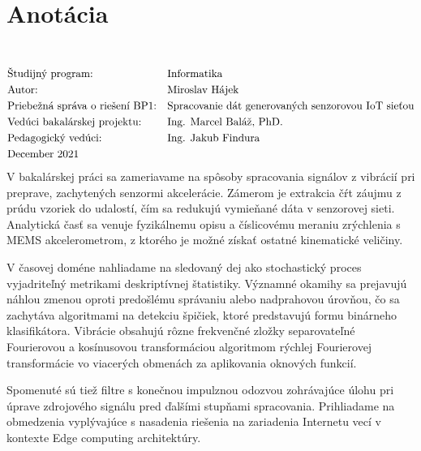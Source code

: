 \thispagestyle{empty}
\section*{Anotácia}
\University \\
\uppercase{\Faculty}
\vspace{-8pt}
{\setlength{\mathindent}{0cm}
\begin{align*}
&\text{Študijný program:} && \text{\StudyProgramme} \\
&\text{Autor:} && \text{\Author} \\
&\text{\Thesis:} && \text{\Title} \\
&\text{Vedúci bakalárskej projektu:} && \text{\Supervisor} \\
&\text{Pedagogický vedúci:} && \text{\PedagogicalSupervisor} \\
&\text{\Date}
\end{align*}}
V bakalárskej práci sa zameriavame na spôsoby spracovania signálov z vibrácií pri preprave, zachytených
senzormi akcelerácie. Zámerom je extrakcia čŕt záujmu z prúdu vzoriek do udalostí, čím sa redukujú vymieňané
dáta v senzorovej sieti. Analytická časť sa venuje fyzikálnemu opisu a číslicovému meraniu zrýchlenia s MEMS akcelerometrom,
z ktorého je možné získať ostatné kinematické veličiny. 

V časovej doméne nahliadame na sledovaný dej ako stochastický
proces vyjadriteľný metrikami deskriptívnej štatistiky. Významné okamihy sa prejavujú náhlou zmenou oproti predošlému správaniu
alebo nadprahovou úrovňou, čo sa zachytáva algoritmami na detekciu špičiek, ktoré predstavujú formu binárneho klasifikátora.
Vibrácie obsahujú rôzne frekvenčné zložky separovateľné Fourierovou a kosínusovou transformáciou algoritmom rýchlej Fourierovej
transformácie vo viacerých obmenách za aplikovania oknových funkcií. 

Spomenuté sú tiež filtre s konečnou impulznou odozvou
zohrávajúce úlohu pri úprave zdrojového signálu pred ďalšími stupňami spracovania. Prihliadame na obmedzenia vyplývajúce
s nasadenia riešenia na zariadenia Internetu vecí v kontexte Edge computing architektúry.

\emptypage

\thispagestyle{empty}
